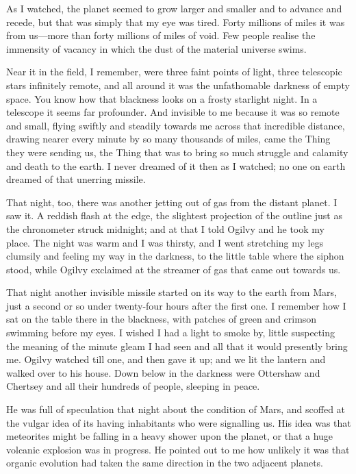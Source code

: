 As I watched, the planet seemed to grow larger and smaller and to advance and recede, but that was simply that my eye was tired. Forty millions of miles it was from us—more than forty millions of miles of void. Few people realise the immensity of vacancy in which the dust of the material universe swims.

Near it in the field, I remember, were three faint points of light, three telescopic stars infinitely remote, and all around it was the unfathomable darkness of empty space. You know how that blackness looks on a frosty starlight night. In a telescope it seems far profounder. And invisible to me because it was so remote and small, flying swiftly and steadily towards me across that incredible distance, drawing nearer every minute by so many thousands of miles, came the Thing they were sending us, the Thing that was to bring so much struggle and calamity and death to the earth. I never dreamed of it then as I watched; no one on earth dreamed of that unerring missile.

That night, too, there was another jetting out of gas from the distant planet. I saw it. A reddish flash at the edge, the slightest projection of the outline just as the chronometer struck midnight; and at that I told Ogilvy and he took my place. The night was warm and I was thirsty, and I went stretching my legs clumsily and feeling my way in the darkness, to the little table where the siphon stood, while Ogilvy exclaimed at the streamer of gas that came out towards us.

That night another invisible missile started on its way to the earth from Mars, just a second or so under twenty-four hours after the first one. I remember how I sat on the table there in the blackness, with patches of green and crimson swimming before my eyes. I wished I had a light to smoke by, little suspecting the meaning of the minute gleam I had seen and all that it would presently bring me. Ogilvy watched till one, and then gave it up; and we lit the lantern and walked over to his house. Down below in the darkness were Ottershaw and Chertsey and all their hundreds of people, sleeping in peace.

He was full of speculation that night about the condition of Mars, and scoffed at the vulgar idea of its having inhabitants who were signalling us. His idea was that meteorites might be falling in a heavy shower upon the planet, or that a huge volcanic explosion was in progress. He pointed out to me how unlikely it was that organic evolution had taken the same direction in the two adjacent planets.

